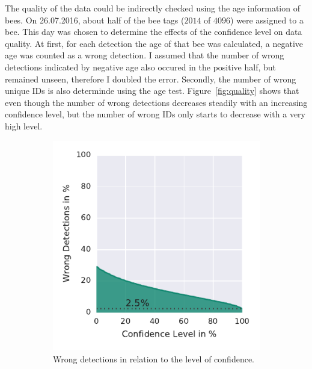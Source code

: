 The quality of the data could be indirectly checked using the age information of bees. On 26.07.2016, about half of the bee tags ($2014$ of $4096$) were assigned to a bee. This day was chosen to determine the effects of the confidence level on data quality.
At first, for each detection the age of that bee was calculated, a negative age was counted as a wrong detection. I assumed that the number of wrong detections indicated by negative age also occured in the positive half, but remained unseen, therefore I doubled the error. Secondly, the number of wrong unique IDs is also determinde using the age test. Figure~\ref{fig:quality} shows that even though the number of wrong detections
decreases steadily with an increasing confidence level, but the number of wrong IDs only starts to decrease with a very high level.

\begin{figure}
    \centering
    \begin{subfigure}[b]{0.45\textwidth}
        \includegraphics[width=\textwidth]{Figures/confVSdetquality}
        \caption[Wrong Detections]{Wrong detections in relation to the level of confidence.}
        \label{fig:confVSdetquality}
    \end{subfigure}
    \begin{subfigure}[b]{0.45\textwidth}

\end{subfigure}
\end{figure}
